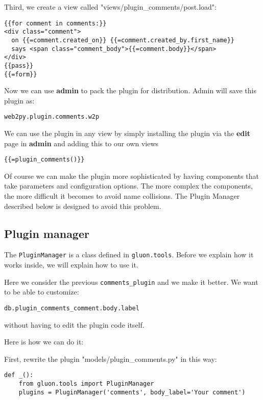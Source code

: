 \documentclass[justified,sixbynine,notoc]{tufte-book}
\def\ft{\small\tt}
\begin{document}
\begin{fullwidth}
Third, we create a view called "views/plugin\_comments/post.load":

\begin{lstlisting}[keywords={}]
{{for comment in comments:}}
<div class="comment">
  on {{=comment.created_on}} {{=comment.created_by.first_name}}
  says <span class="comment_body">{{=comment.body}}</span>
</div>
{{pass}}
{{=form}}
\end{lstlisting}

Now we can use {\bf admin} to pack the plugin for distribution. Admin will save this plugin as:

\begin{lstlisting}
web2py.plugin.comments.w2p
\end{lstlisting}

We can use the plugin in any view by simply installing the plugin via the {\bf edit} page in {\bf admin} and adding this to our own views

\begin{lstlisting}[keywords={}]
{{=plugin_comments()}}
\end{lstlisting}

Of course we can make the plugin more sophisticated by having components that take parameters and configuration options. The more complex the components, the more difficult it becomes to avoid name collisions. The Plugin Manager described below is designed to avoid this problem.

\goodbreak\subsection{Plugin manager}

The {\ft PluginManager} is a class defined in {\ft gluon.tools}. Before we explain how it works inside, we will explain how to use it.

Here we consider the previous {\ft comments\_plugin} and we make it better. We want to be able to customize:

\begin{lstlisting}
db.plugin_comments_comment.body.label
\end{lstlisting}
\noindent without having to edit the plugin code itself.

Here is how we can do it:

First, rewrite the plugin "models/plugin\_comments.py" in this way:

\begin{lstlisting}
def _():
    from gluon.tools import PluginManager
    plugins = PluginManager('comments', body_label='Your comment')


\end{lstlisting}
\end{fullwidth}
\end{document}
